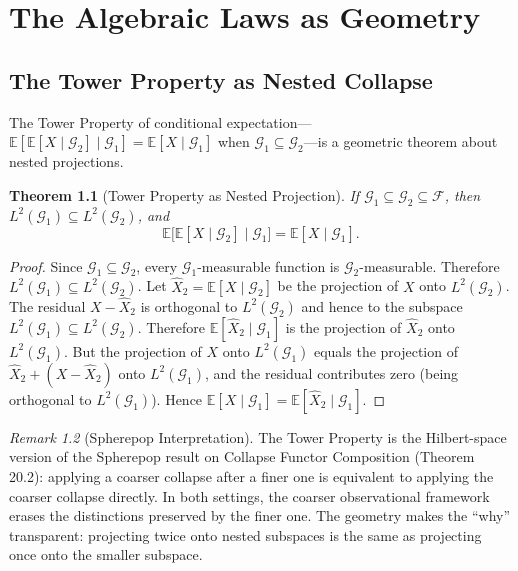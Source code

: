 \documentclass[12pt, a4paper, openany]{book}
\theoremstyle{plain}
\newtheorem{theorem}{Theorem}[chapter]
\theoremstyle{definition}
\theoremstyle{remark}
\newtheorem{remark}[theorem]{Remark}
\begin{document}
\chapter{The Algebraic Laws as Geometry}

\section{The Tower Property as Nested Collapse}

The Tower Property of conditional expectation---$\mathbb{E}[\mathbb{E}[X \mid
\mathcal{G}_2] \mid \mathcal{G}_1] = \mathbb{E}[X \mid \mathcal{G}_1]$ when
$\mathcal{G}_1 \subseteq \mathcal{G}_2$---is a geometric theorem about nested
projections.

\begin{theorem}[Tower Property as Nested Projection]
If $\mathcal{G}_1 \subseteq \mathcal{G}_2 \subseteq \mathcal{F}$, then
$L^2(\mathcal{G}_1) \subseteq L^2(\mathcal{G}_2)$, and
\[
\mathbb{E}\bigl[\mathbb{E}[X \mid \mathcal{G}_2] \mid \mathcal{G}_1\bigr]
= \mathbb{E}[X \mid \mathcal{G}_1].
\]
\end{theorem}

\begin{proof}
Since $\mathcal{G}_1 \subseteq \mathcal{G}_2$, every $\mathcal{G}_1$-measurable
function is $\mathcal{G}_2$-measurable. Therefore $L^2(\mathcal{G}_1) \subseteq
L^2(\mathcal{G}_2)$. Let $\hat{X}_2 = \mathbb{E}[X \mid \mathcal{G}_2]$ be
the projection of $X$ onto $L^2(\mathcal{G}_2)$. The residual
$X - \hat{X}_2$ is orthogonal to $L^2(\mathcal{G}_2)$ and hence to the subspace
$L^2(\mathcal{G}_1) \subseteq L^2(\mathcal{G}_2)$. Therefore
$\mathbb{E}[\hat{X}_2 \mid \mathcal{G}_1]$ is the projection of $\hat{X}_2$ onto
$L^2(\mathcal{G}_1)$. But the projection of $X$ onto $L^2(\mathcal{G}_1)$ equals
the projection of $\hat{X}_2 + (X - \hat{X}_2)$ onto $L^2(\mathcal{G}_1)$, and
the residual contributes zero (being orthogonal to $L^2(\mathcal{G}_1)$). Hence
$\mathbb{E}[X \mid \mathcal{G}_1] = \mathbb{E}[\hat{X}_2 \mid \mathcal{G}_1]$.
\end{proof}

\begin{remark}[Spherepop Interpretation]
The Tower Property is the Hilbert-space version of the Spherepop result on
Collapse Functor Composition (Theorem 20.2): applying a coarser collapse after
a finer one is equivalent to applying the coarser collapse directly. In both
settings, the coarser observational framework erases the distinctions preserved
by the finer one. The geometry makes the ``why'' transparent: projecting twice
onto nested subspaces is the same as projecting once onto the smaller subspace.
\end{remark}
\end{document}
